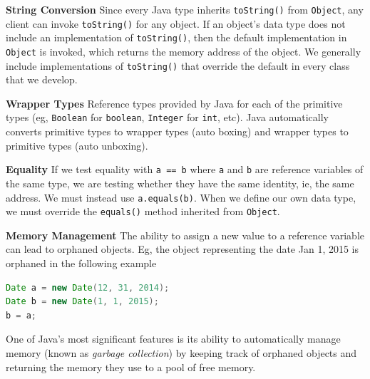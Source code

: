 \documentclass[8pt,a4paper,compress]{beamer}
\begin{document}
\begin{frame}[fragile]
\pause

\textbf{String Conversion} Since every Java type inherits \lstinline$toString()$ from \lstinline$Object$, any client can invoke \lstinline$toString()$ for any object. If an object's data type does not include an implementation of \lstinline$toString()$, then the default implementation in \lstinline$Object$ is invoked,
which returns the memory address of the object. We generally include implementations of \lstinline$toString()$ that override the default in every class that we develop.

\pause
\smallskip

\textbf{Wrapper Types} Reference types provided by Java for each of the primitive types (eg, \lstinline$Boolean$ for \lstinline$boolean$, \lstinline$Integer$ for \lstinline$int$, etc). Java automatically converts primitive types to wrapper types (auto boxing) and wrapper types to primitive types (auto unboxing).

\pause
\smallskip

\textbf{Equality} If we test equality with \lstinline$a == b$ where \lstinline$a$ and \lstinline$b$ are reference variables of the same type, we are testing whether they have the same identity, ie, the same address. We must instead use \lstinline$a.equals(b)$. When we define our own data type, we must override the \lstinline$equals()$ method inherited from \lstinline$Object$.

\pause
\smallskip

\textbf{Memory Management} The ability to assign a new value to a reference variable can lead to orphaned objects. Eg, the object representing the date Jan 1, 2015 is orphaned in the following example

\begin{lstlisting}[language=Java]
Date a = new Date(12, 31, 2014);
Date b = new Date(1, 1, 2015);
b = a;
\end{lstlisting}

One of Java's most significant features is its ability to automatically manage memory (known as \emph{garbage collection}) by keeping track of orphaned objects and returning the memory they use to a pool of free memory. 

\end{frame}
\end{document}
